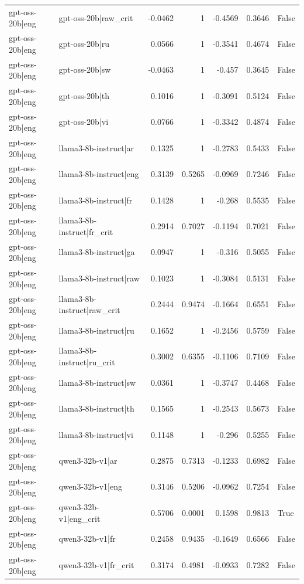 \begin{table}
\begin{tabular}{l l r r r r l}
gpt-oss-20b|eng & gpt-oss-20b|raw_crit & -0.0462 & 1 & -0.4569 & 0.3646 & False \\
gpt-oss-20b|eng & gpt-oss-20b|ru & 0.0566 & 1 & -0.3541 & 0.4674 & False \\
gpt-oss-20b|eng & gpt-oss-20b|sw & -0.0463 & 1 & -0.457 & 0.3645 & False \\
gpt-oss-20b|eng & gpt-oss-20b|th & 0.1016 & 1 & -0.3091 & 0.5124 & False \\
gpt-oss-20b|eng & gpt-oss-20b|vi & 0.0766 & 1 & -0.3342 & 0.4874 & False \\
gpt-oss-20b|eng & llama3-8b-instruct|ar & 0.1325 & 1 & -0.2783 & 0.5433 & False \\
gpt-oss-20b|eng & llama3-8b-instruct|eng & 0.3139 & 0.5265 & -0.0969 & 0.7246 & False \\
gpt-oss-20b|eng & llama3-8b-instruct|fr & 0.1428 & 1 & -0.268 & 0.5535 & False \\
gpt-oss-20b|eng & llama3-8b-instruct|fr_crit & 0.2914 & 0.7027 & -0.1194 & 0.7021 & False \\
gpt-oss-20b|eng & llama3-8b-instruct|ga & 0.0947 & 1 & -0.316 & 0.5055 & False \\
gpt-oss-20b|eng & llama3-8b-instruct|raw & 0.1023 & 1 & -0.3084 & 0.5131 & False \\
gpt-oss-20b|eng & llama3-8b-instruct|raw_crit & 0.2444 & 0.9474 & -0.1664 & 0.6551 & False \\
gpt-oss-20b|eng & llama3-8b-instruct|ru & 0.1652 & 1 & -0.2456 & 0.5759 & False \\
gpt-oss-20b|eng & llama3-8b-instruct|ru_crit & 0.3002 & 0.6355 & -0.1106 & 0.7109 & False \\
gpt-oss-20b|eng & llama3-8b-instruct|sw & 0.0361 & 1 & -0.3747 & 0.4468 & False \\
gpt-oss-20b|eng & llama3-8b-instruct|th & 0.1565 & 1 & -0.2543 & 0.5673 & False \\
gpt-oss-20b|eng & llama3-8b-instruct|vi & 0.1148 & 1 & -0.296 & 0.5255 & False \\
gpt-oss-20b|eng & qwen3-32b-v1|ar & 0.2875 & 0.7313 & -0.1233 & 0.6982 & False \\
gpt-oss-20b|eng & qwen3-32b-v1|eng & 0.3146 & 0.5206 & -0.0962 & 0.7254 & False \\
gpt-oss-20b|eng & qwen3-32b-v1|eng_crit & 0.5706 & 0.0001 & 0.1598 & 0.9813 & True \\
gpt-oss-20b|eng & qwen3-32b-v1|fr & 0.2458 & 0.9435 & -0.1649 & 0.6566 & False \\
gpt-oss-20b|eng & qwen3-32b-v1|fr_crit & 0.3174 & 0.4981 & -0.0933 & 0.7282 & False \\

\end{tabular}
\end{table}
